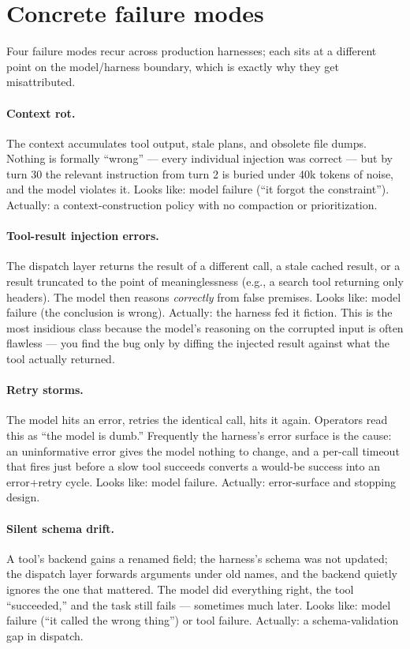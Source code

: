 \documentclass[11pt]{article}
\begin{document}
\section{Concrete failure modes}
Four failure modes recur across production harnesses; each sits at a different point on the model/harness boundary, which is exactly why they get misattributed.

\paragraph{Context rot.} The context accumulates tool output, stale plans, and obsolete file dumps. Nothing is formally ``wrong'' --- every individual injection was correct --- but by turn 30 the relevant instruction from turn 2 is buried under 40k tokens of noise, and the model violates it. Looks like: model failure (``it forgot the constraint''). Actually: a context-construction policy with no compaction or prioritization.

\paragraph{Tool-result injection errors.} The dispatch layer returns the result of a different call, a stale cached result, or a result truncated to the point of meaninglessness (e.g., a search tool returning only headers). The model then reasons \emph{correctly} from false premises. Looks like: model failure (the conclusion is wrong). Actually: the harness fed it fiction. This is the most insidious class because the model's reasoning on the corrupted input is often flawless --- you find the bug only by diffing the injected result against what the tool actually returned.

\paragraph{Retry storms.} The model hits an error, retries the identical call, hits it again. Operators read this as ``the model is dumb.'' Frequently the harness's error surface is the cause: an uninformative error gives the model nothing to change, and a per-call timeout that fires just before a slow tool succeeds converts a would-be success into an error+retry cycle. Looks like: model failure. Actually: error-surface and stopping design.

\paragraph{Silent schema drift.} A tool's backend gains a renamed field; the harness's schema was not updated; the dispatch layer forwards arguments under old names, and the backend quietly ignores the one that mattered. The model did everything right, the tool ``succeeded,'' and the task still fails --- sometimes much later. Looks like: model failure (``it called the wrong thing'') or tool failure. Actually: a schema-validation gap in dispatch.
\end{document}
